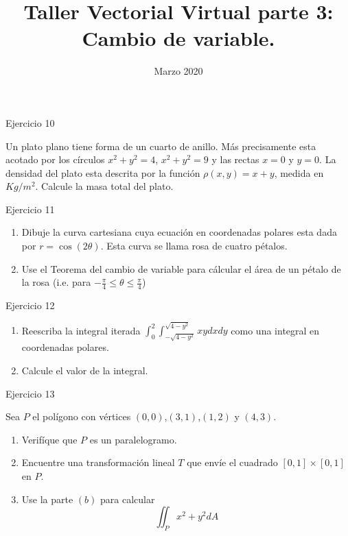 \documentclass[usepdftitle=false]{beamer}
\title[]{Taller Vectorial Virtual parte 3: Cambio de variable.}
\date{Marzo 2020}
\begin{document}
\begin{frame}
  \titlepage
\end{frame}

\begin{frame}{Ejercicio 10}

Un plato plano tiene forma de un cuarto de anillo. M\'as precisamente esta acotado por los c\'irculos $x^2+y^2=4$, $x^2+y^2=9$ y las rectas $x=0$ y $y=0$. La densidad del plato esta descrita por la funci\'on $\rho(x,y)=x+y$, medida en $Kg/m^2$. Calcule la masa total del plato.
 \end{frame}

\begin{frame}{Ejercicio 11}
\begin{enumerate}
\item Dibuje la curva cartesiana cuya ecuaci\'on en coordenadas polares esta dada por $r=\cos(2\theta)$. Esta curva se llama rosa de cuatro p\'etalos.

\item Use el Teorema del cambio de variable para c\'alcular el \'area de un p\'etalo de la rosa (i.e. para $-\frac{\pi}{4}\leq \theta\leq \frac{\pi}{4}$)
\end{enumerate}

\end{frame}

\begin{frame}{Ejercicio 12}

\begin{enumerate}
\item Reescriba la integral iterada $\int_0^2\int_{-\sqrt{4-y^2}}^{\sqrt{4-y^2}}xydxdy$ como una integral en coordenadas polares.
\item Calcule el valor de la integral.
\end{enumerate}
\end{frame}


\begin{frame}{Ejercicio 13}

Sea $P$ el pol\'igono con v\'ertices $(0,0)$,$(3,1)$,$(1,2)$ y $(4,3)$.

\begin{enumerate}
\item Verif\'ique que $P$ es un paralelogramo.
\item Encuentre una transformaci\'on lineal $T$ que env\'ie el cuadrado $[0,1]\times [0,1]$ en $P$.
\item Use la parte $(b)$ para calcular 
\[\iint_P x^2+y^2 dA\]
\end{enumerate}


\end{frame}
\end{document}

